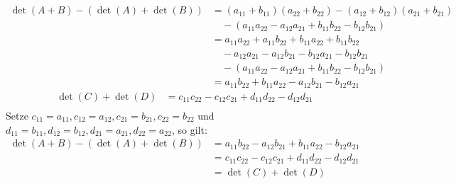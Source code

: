 \documentclass[sectionformat = aufgabe]{gadsescript}
\begin{document}
\subsection{}
\begin{align*}
	\det\left( A + B \right) - \left( \det (A) + \det (B) \right)
	&= (a_{11} + b_{11}) \left( a_{22} + b_{22} \right) - \left( a_{12} + b_{12} \right) \left( a_{21} + b_{21} \right)\\
	&\quad - \left( a_{11} a_{22} - a_{12}a_{21} + b_{11}b_{22} - b_{12}b_{21} \right)\\
	&= a_{11}a_{22} + a_{11}b_{22} + b_{11}a_{22} + b_{11}b_{22} \\
	&\quad - a_{12}a_{21} - a_{12}b_{21} - b_{12}a_{21} - b_{12}b_{21} \\
	&\quad - \left( a_{11} a_{22} - a_{12}a_{21} + b_{11}b_{22} - b_{12}b_{21} \right)\\
	~ &= a_{11}b_{22} + b_{11}a_{22} - a_{12}b_{21} - b_{12}a_{21}
\end{align*}
\begin{align*}
	\det\left( C \right) + \det\left( D \right) &= c_{11}c_{22} - c_{12}c_{21} + d_{11}d_{22} - d_{12}d_{21} \\
\end{align*}
Setze
$ c_{11} = a_{11}, c_{12} = a_{12}, c_{21} = b_{21}, c_{22} = b_{22} $ und
$ d_{11} = b_{11}, d_{12} = b_{12}, d_{21} = a_{21}, d_{22} = a_{22} $,
so gilt:
\begin{align*}
	\det\left( A + B \right) - \left( \det\left( A \right) + \det \left( B \right)  \right)
	&= a_{11}b_{22} - a_{12}b_{21} + b_{11}a_{22} - b_{12}a_{21} \\
	&= c_{11}c_{22} - c_{12}c_{21} + d_{11}d_{22} - d_{12}d_{21} \\
	&= \det(C) + \det(D)
\end{align*}
\end{document}
